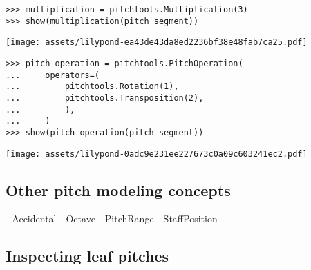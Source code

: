 \begin{comment}
<abjad>
multiplication = pitchtools.Multiplication(3)
show(multiplication(pitch_segment))
</abjad>
\end{comment}

\begin{abjadbookoutput}
\begin{singlespacing}
\vspace{-0.5\baselineskip}
\begin{lstlisting}
>>> multiplication = pitchtools.Multiplication(3)
>>> show(multiplication(pitch_segment))
\end{lstlisting}
\noindent\texttt{[image: assets/lilypond-ea43de43da8ed2236bf38e48fab7ca25.pdf]}
\end{singlespacing}
\end{abjadbookoutput}

\begin{comment}
<abjad>
pitch_operation = pitchtools.PitchOperation(
    operators=(
        pitchtools.Rotation(1),
        pitchtools.Transposition(2),
        ),
    )
show(pitch_operation(pitch_segment))
</abjad>
\end{comment}

\begin{abjadbookoutput}
\begin{singlespacing}
\vspace{-0.5\baselineskip}
\begin{lstlisting}
>>> pitch_operation = pitchtools.PitchOperation(
...     operators=(
...         pitchtools.Rotation(1),
...         pitchtools.Transposition(2),
...         ),
...     )
>>> show(pitch_operation(pitch_segment))
\end{lstlisting}
\noindent\texttt{[image: assets/lilypond-0adc9e231ee227673c0a09c603241ec2.pdf]}
\end{singlespacing}
\end{abjadbookoutput}

\subsection{Other pitch modeling concepts}

\begin{markdown}
-   Accidental
-   Octave
-   PitchRange
-   StaffPosition
\end{markdown}

\subsection{Inspecting leaf pitches}


